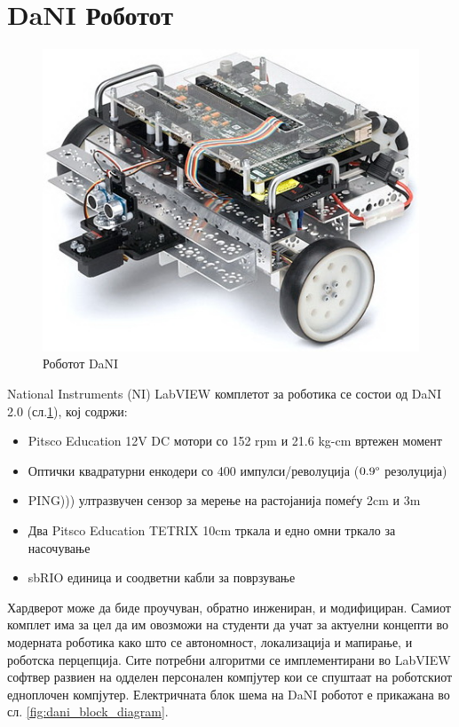 \documentclass[11pt]{article}
\begin{document}
\newpage
\section{DaNI Роботот}
  \begin{figure}[H]
    \includegraphics[width=0.6\linewidth, keepaspectratio]{./images/dani_isometric.jpg}
    \centering
    \caption{Роботот DaNI}
    \label{fig:dani_isometric}
    \end{figure}

	National Instruments (NI) LabVIEW комплетот за роботика се состои од DaNI 2.0 (сл.\ref{fig:dani_isometric}), кој содржи:

	\begin{itemize}
		\item Pitsco Education 12V DC мотори со 152 rpm и 21.6 kg-cm вртежен момент
		\item Оптички квадратурни енкодери со 400 импулси/револуција ($0.9\degree$ резолуција)
		\item PING))) ултразвучен сензор за мерење на растојанија помеѓу 2cm и 3m
		\item Два Pitsco Education TETRIX 10cm тркала и едно омни тркало за насочување
		\item sbRIO единица и соодветни кабли за поврзување
		\end{itemize}

	Хардверот може да биде проучуван, обратно инжениран, и модифициран. Самиот комплет има за цел да им овозможи на студенти да учат за актуелни концепти во модерната роботика како што се автономност, локализација и мапирање, и роботска перцепција. Сите потребни алгоритми се имплементирани во LabVIEW софтвер развиен на одделен персонален компјутер кои се спуштаат на роботскиот едноплочен компјутер. Електричната блок шема на DaNI роботот е прикажана во сл. \ref{fig:dani_block_diagram}.
\end{document}
